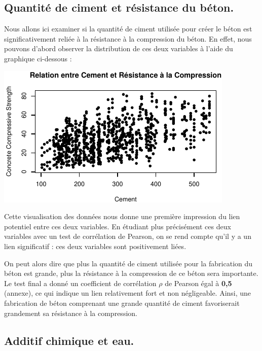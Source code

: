 \documentclass[
  12pt,
]{article}
\begin{document}
\subsection{Quantité de ciment et résistance du
béton.}\label{quantituxe9-de-ciment-et-ruxe9sistance-du-buxe9ton.}

Nous allons ici examiner si la quantité de ciment utilisée pour créer le
béton est significativement reliée à la résistance à la compression du
béton. En effet, nous pouvons d'abord observer la distribution de ces
deux variables à l'aide du graphique ci-dessous :

\begin{center}\includegraphics{rmd_final_files/figure-latex/unnamed-chunk-2-1} \end{center}

Cette visualisation des données nous donne une première impression du
lien potentiel entre ces deux variables. En étudiant plus précisément
ces deux variables avec un test de corrélation de Pearson, on se rend
compte qu'il y a un lien significatif : ces deux variables sont
positivement liées.

On peut alors dire que plus la quantité de ciment utilisée pour la
fabrication du béton est grande, plus la résistance à la compression de
ce béton sera importante. Le test final a donné un coefficient de
corrélation \(\rho\) de Pearson égal à \textbf{0,5} (annexe), ce qui
indique un lien relativement fort et non négligeable. Ainsi, une
fabrication de béton comprenant une grande quantité de ciment
favoriserait grandement sa résistance à la compression.

\subsection{Additif chimique et eau.}\label{additif-chimique-et-eau.}
\end{document}
